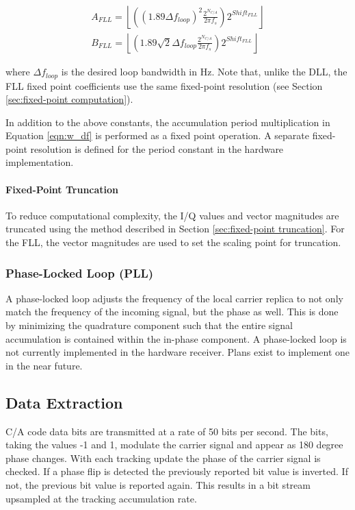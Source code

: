 \documentclass[12pt]{article}
\begin{document}
\begin{gather*}
A_{FLL} = \left\lfloor \left( (1.89 \Delta f_{loop})^2 \frac{2^{N_{C/A}}}{2 \pi f_{s}} \right) 2^{Shift_{FLL}} \right\rfloor \\
B_{FLL} = \left\lfloor \left( 1.89 \sqrt{2} \Delta f_{loop} \frac{2^{N_{C/A}}}{2 \pi f_{s}} \right) 2^{Shift_{FLL}} \right\rfloor
\end{gather*}

where $\Delta f_{loop}$ is the desired loop bandwidth in Hz. Note that, unlike the DLL, the FLL fixed point coefficients use the same fixed-point resolution (see Section \ref{sec:fixed-point computation}).

In addition to the above constants, the accumulation period multiplication in Equation \ref{eqn:w_df} is performed as a fixed point operation. A separate fixed-point resolution is defined for the period constant in the hardware implementation.

\paragraph{Fixed-Point Truncation}
To reduce computational complexity, the I/Q values and vector magnitudes are truncated using the method described in Section \ref{sec:fixed-point truncation}. For the FLL, the vector magnitudes are used to set the scaling point for truncation.

\subsubsection{Phase-Locked Loop (PLL)}
A phase-locked loop adjusts the frequency of the local carrier replica to not only match the frequency of the incoming signal, but the phase as well. This is done by minimizing the quadrature component such that the entire signal accumulation is contained within the in-phase component. A phase-locked loop is not currently implemented in the hardware receiver. Plans exist to implement one in the near future.

\subsection{Data Extraction}
C/A code data bits are transmitted at a rate of 50 bits per second. The bits, taking the values -1 and 1, modulate the carrier signal and appear as 180 degree phase changes. With each tracking update the phase of the carrier signal is checked. If a phase flip is detected the previously reported bit value is inverted. If not, the previous bit value is reported again. This results in a bit stream upsampled at the tracking accumulation rate.
\end{document}
